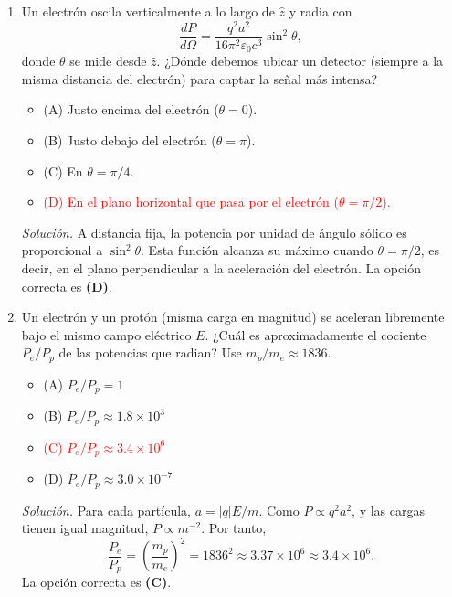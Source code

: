 \documentclass[11pt]{article}
\begin{document}
\begin{enumerate}
    \item Un electrón oscila verticalmente a lo largo de $\hat{z}$ y radia con
    \[
        \frac{dP}{d\Omega}=\frac{q^2a^2}{16\pi^2\varepsilon_0c^3}\sin^2\theta,
    \]
    donde $\theta$ se mide desde $\hat{z}$. ¿Dónde debemos ubicar un detector (siempre a la misma distancia del electrón) para captar la señal más intensa?
    \begin{itemize}
        \item (A) Justo encima del electrón ($\theta=0$).
        \item (B) Justo debajo del electrón ($\theta=\pi$).
        \item (C) En $\theta=\pi/4$.
        \item \textcolor{red}{(D) En el plano horizontal que pasa por el electrón ($\theta=\pi/2$).}
    \end{itemize}
    \textit{Solución.} A distancia fija, la potencia por unidad de ángulo sólido es proporcional a $\sin^2\theta$. Esta función alcanza su máximo cuando $\theta=\pi/2$, es decir, en el plano perpendicular a la aceleración del electrón. La opción correcta es \textbf{(D)}. \parencite{chaparro2026}

    \item Un electrón y un protón (misma carga en magnitud) se aceleran libremente bajo el mismo campo eléctrico $E$. ¿Cuál es aproximadamente el cociente $P_e/P_p$ de las potencias que radian? Use $m_p/m_e\approx1836$.
    \begin{itemize}
        \item (A) $P_e/P_p=1$
        \item (B) $P_e/P_p\approx1.8\times10^3$
        \item \textcolor{red}{(C) $P_e/P_p\approx3.4\times10^6$}
        \item (D) $P_e/P_p\approx3.0\times10^{-7}$
    \end{itemize}
    \textit{Solución.} Para cada partícula, $a=|q|E/m$. Como $P\propto q^2a^2$, y las cargas tienen igual magnitud, $P\propto m^{-2}$. Por tanto,
    \[
        \frac{P_e}{P_p}=\left(\frac{m_p}{m_e}\right)^2
        =1836^2\approx3.37\times10^6\approx3.4\times10^6.
    \]
    La opción correcta es \textbf{(C)}. \parencite{chaparro2026}


\end{enumerate}
\end{document}
